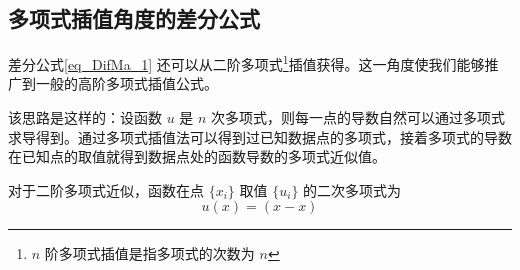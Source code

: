 \subsection{多项式插值角度的差分公式}
差分公式\autoref{eq_DifMa_1} 还可以从二阶多项式\footnote{$n$ 阶多项式插值是指多项式的次数为 $n$}插值获得。这一角度使我们能够推广到一般的高阶多项式插值公式。

该思路是这样的：设函数 $u$ 是 $n$ 次多项式，则每一点的导数自然可以通过多项式求导得到。通过多项式插值法可以得到过已知数据点的多项式，接着多项式的导数在已知点的取值就得到数据点处的函数导数的多项式近似值。

对于二阶多项式近似，函数在点 $\{x_i\}$ 取值 $\{u_i\}$ 的二次多项式为
\begin{equation}
u(x)=(x-x)
\end{equation}
 



